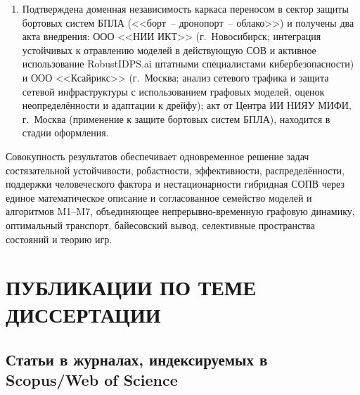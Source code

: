 \documentclass[12pt,a5paper]{article}
\begin{document}
\begin{enumerate}
\item Подтверждена доменная независимость каркаса
переносом в сектор защиты бортовых систем БПЛА
(<<борт~-- дронопорт~-- облако>>) и получены два акта
внедрения: ООО <<НИИ ИКТ>> (г.~Новосибирск; интеграция
устойчивых к отравлению моделей в действующую СОВ и
активное использование RobustIDPS.ai штатными
специалистами кибербезопасности) и ООО <<Ксайрикс>>
(г.~Москва; анализ сетевого трафика и защита сетевой
инфраструктуры с использованием графовых моделей,
оценок неопределённости и адаптации к дрейфу);
акт от Центра ИИ НИЯУ МИФИ, г.~Москва (применение к
защите бортовых систем БПЛА), находится в стадии
оформления.
\end{enumerate}

Совокупность результатов обеспечивает одновременное решение
задач состязательной устойчивости, робастности, эффективности,
распределённости, поддержки человеческого фактора и
нестационарности гибридная СОПВ через единое математическое
описание и согласованное семейство моделей и алгоритмов M1--M7,
объединяющее непрерывно-временную графовую динамику, оптимальный
транспорт, байесовский вывод, селективные пространства
состояний и теорию игр.

\vspace{1cm}

\section*{ПУБЛИКАЦИИ ПО ТЕМЕ ДИССЕРТАЦИИ}

\sloppy

\subsection*{Статьи в журналах, индексируемых в Scopus/Web of Science}
\end{document}
